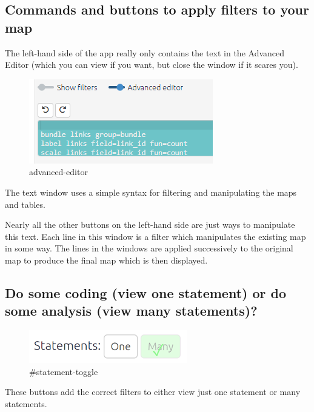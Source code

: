 \documentclass[
]{book}
\begin{document}
\hypertarget{commands-and-buttons-to-apply-filters-to-your-map-1}{%
\subsection{Commands and buttons to apply filters to your map}\label{commands-and-buttons-to-apply-filters-to-your-map-1}}

The left-hand side of the app really only contains the text in the Advanced Editor (which you can view if you want, but close the window if it scares you).

\begin{figure}
\centering
\includegraphics{_assets/image-20210914103354673.png}
\caption{advanced-editor}
\end{figure}

The text window uses a simple syntax for filtering and manipulating the maps and tables.

Nearly all the other buttons on the left-hand side are just ways to manipulate this text. Each line in this window is a filter which manipulates the existing map in some way. The lines in the windows are applied successively to the original map to produce the final map which is then displayed.

\hypertarget{xstatement-view}{%
\subsection{Do some coding (view one statement) or do some analysis (view many statements)?}\label{xstatement-view}}

\begin{figure}
\centering
\includegraphics{_assets/image-20211026110623336.png}
\caption{\#statement-toggle}
\end{figure}

These buttons add the correct filters to either view just one statement or many statements.
\end{document}
